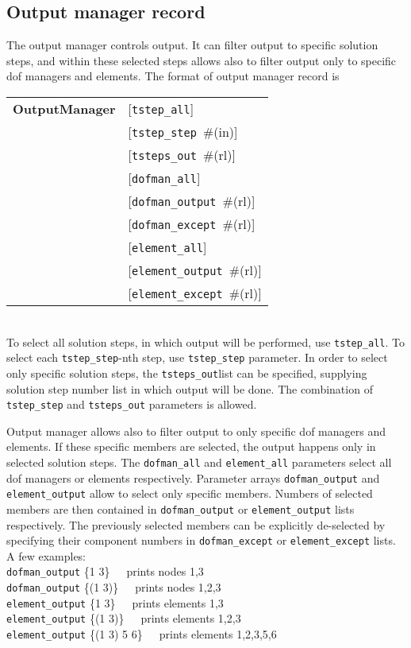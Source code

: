 \documentclass[a4paper]{article}
\newcommand{\param}[1]{\texttt{#1}} %
\newcommand{\optional}[1]{[#1]} %
\newcommand{\field}[2]{\param{#1}~\#{\tiny(#2)}} %
\newcommand{\optField}[2]{\optional{\field{#1}{#2}}}
\newcommand{\fieldnotype}[1]{\param{#1}}
\newcommand{\entKeywordInst}[1]{\textbf{#1}} %
\newenvironment{record}[1][]{\begin{tabular}{|ll}}{\end{tabular}\\}
\newcommand{\recentry}[2]{{#1}&{#2}\\}
\newcounter{rcc}
\newenvironment{record}[1][\textwidth]{\setcounter{rcc}{0}\rowcolors{1}{lightgray}{lightgray}\tabularx{#1}{llR} \hline}
               {\endtabularx}
\newcommand{\recentry}[2]{\ifthenelse{\value{rcc}>0}{$\backslash$ \\}{\setcounter{rcc}{1}}{#1}&{#2}&}
\begin{document}
\subsection{Output manager record}
\label{_OutputManagerRecord}
The output manager controls output. It can filter output to specific
solution steps, and within these selected steps allows also to filter
output only to specific dof managers and elements. The format of
output manager record is \\
\begin{record}
  \recentry{\entKeywordInst{OutputManager}}{[\fieldnotype{tstep\_all}]}
  \recentry{}{\optField{tstep\_step}{in}}
  \recentry{}{\optField{tsteps\_out}{rl}}
  \recentry{}{[\fieldnotype{dofman\_all}]}
  \recentry{}{\optField{dofman\_output}{rl}}
  \recentry{}{\optField{dofman\_except}{rl}}
  \recentry{}{[\fieldnotype{element\_all}]}
  \recentry{}{\optField{element\_output}{rl}}
  \recentry{}{\optField{element\_except}{rl}}
\end{record}
To select all solution steps, in which output will be performed, use
\param{tstep\_all}. To select each \param{tstep\_step}-nth step, use
\param{tstep\_step} parameter. In order to select only specific
solution steps, the \param{tsteps\_out}list can be specified,
supplying solution step number list in which output will be done.
The combination of \param{tstep\_step} and
\param{tsteps\_out} parameters is allowed.

Output manager allows also to filter output to only specific dof
managers and elements. If these specific members are selected, the
output happens only in selected solution steps.
The \param{dofman\_all} and \param{element\_all} parameters select
all dof managers or elements respectively. Parameter arrays
\param{dofman\_output} and \param{element\_output} allow to select
only specific members. Numbers of selected members are then contained
in \param{dofman\_output} or \param{element\_output} lists
respectively. The previously selected members can be explicitly
de-selected by specifying their component numbers in \param{dofman\_except} or
\param{element\_except} lists. A few examples:\\
\param{dofman\_output} \{1 3\}~~~prints nodes 1,3\\
\param{dofman\_output} \{(1 3)\}~~~prints nodes 1,2,3\\
\param{element\_output} \{1 3\}~~~prints elements 1,3\\
\param{element\_output} \{(1 3)\}~~~prints elements 1,2,3\\
\param{element\_output} \{(1 3) 5 6\}~~~prints elements 1,2,3,5,6\\
\end{document}
